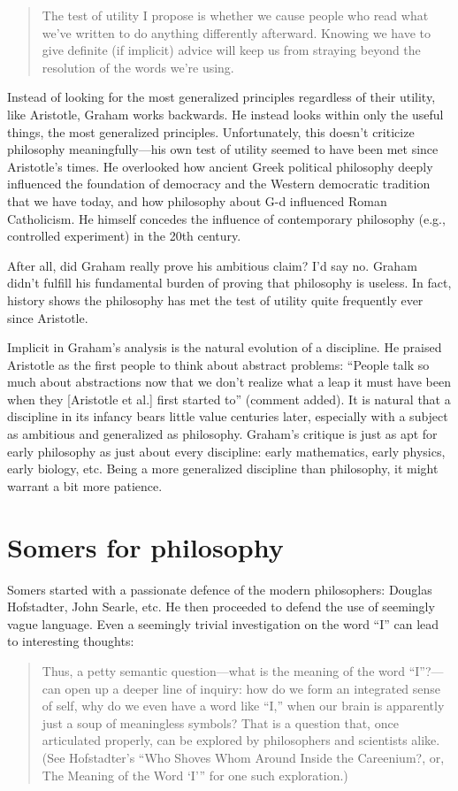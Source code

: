 \documentclass[12pt]{article}
\begin{document}
\begin{quotation}
 The test of utility I propose is whether we cause people who read what we've written to do anything differently afterward. Knowing we have to give definite (if implicit) advice will keep us from straying beyond the resolution of the words we're using.
\end{quotation}

Instead of looking for the most generalized principles regardless of their utility, like Aristotle, Graham works backwards. He instead looks within only the useful things, the most generalized principles. Unfortunately, this doesn't criticize philosophy meaningfully---his own test of utility seemed to have been met since Aristotle's times. He overlooked how ancient Greek political philosophy deeply influenced the foundation of democracy and the Western democratic tradition that we have today, and how philosophy about G-d influenced Roman Catholicism. He himself concedes the influence of contemporary philosophy (e.g., controlled experiment) in the 20th century.

After all, did Graham really prove his ambitious claim? I'd say no. Graham didn't fulfill his fundamental burden of proving that philosophy is useless. In fact, history shows the philosophy has met the test of utility quite frequently ever since Aristotle.

Implicit in Graham's analysis is the natural evolution of a discipline. He praised Aristotle as the first people to think about abstract problems: \enquote{People talk so much about abstractions now that we don't realize what a leap it must have been when they [Aristotle et al.] first started to} (comment added). It is natural that a discipline in its infancy bears little value centuries later, especially with a subject as ambitious and generalized as philosophy. Graham's critique is just as apt for early philosophy as just about every discipline: early mathematics, early physics, early biology, etc. Being a more generalized discipline than philosophy, it might warrant a bit more patience.

\section{Somers for philosophy}

Somers started with a passionate defence of the modern philosophers: Douglas Hofstadter, John Searle, etc. He then proceeded to defend the use of seemingly vague language. Even a seemingly trivial investigation on the word \enquote{I} can lead to interesting thoughts:
\begin{quotation}
 Thus, a petty semantic question—what is the meaning of the word \enquote{I}?—can open up a deeper line of inquiry: how do we form an integrated sense of self, why do we even have a word like “I,” when our brain is apparently just a soup of meaningless symbols? That is a question that, once articulated properly, can be explored by philosophers and scientists alike. (See Hofstadter’s “Who Shoves Whom Around Inside the Careenium?, or, The Meaning of the Word ‘I’” for one such exploration.)
\end{quotation}
\end{document}
